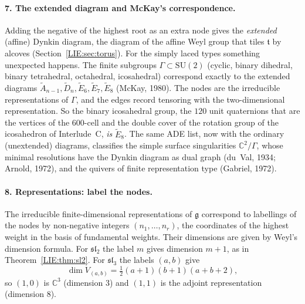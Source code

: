 \documentclass[11pt,openany]{book}
\theoremstyle{plain}
\theoremstyle{definition}
\theoremstyle{remark}
\newcommand{\C}{\mathbb{C}}
\begin{document}
\paragraph{7. The extended diagram and McKay's correspondence.} Adding the negative of the highest
root as an extra node gives the \emph{extended} (affine) Dynkin diagram, the diagram of the affine
Weyl group that tiles $\mathfrak t$ by alcoves (Section~\ref{LIE:sec:torus}). For the simply laced types
something unexpected happens. The finite subgroups $\Gamma\subset\mathrm{SU}(2)$ (cyclic, binary dihedral,
binary tetrahedral, octahedral, icosahedral) correspond exactly to the extended diagrams
$\tilde A_{n-1},\tilde D_n,\tilde E_6,\tilde E_7,\tilde E_8$ (McKay, 1980). The nodes are the
irreducible representations of $\Gamma$, and the edges record tensoring with the two-dimensional
representation. So the binary icosahedral group, the $120$ unit quaternions that are the vertices of
the $600$-cell and the double cover of the rotation group of the icosahedron of Interlude~C, \emph{is}
$\tilde E_8$. The same ADE list, now with the ordinary (unextended) diagrams, classifies the simple
surface singularities $\C^2/\Gamma$, whose minimal resolutions have the Dynkin diagram as dual graph
(du~Val, 1934; Arnold, 1972), and the quivers of finite representation type (Gabriel, 1972).

\paragraph{8. Representations: label the nodes.} The irreducible finite-dimensional representations
of $\mathfrak g$ correspond to labellings of the nodes by non-negative integers $(n_1,\dots,n_r)$, the
coordinates of the highest weight in the basis of fundamental weights. Their dimensions are given by
Weyl's dimension formula. For $\mathfrak{sl}_2$ the label $m$ gives dimension $m+1$, as in
Theorem~\ref{LIE:thm:sl2}. For $\mathfrak{sl}_3$ the labels $(a,b)$ give
\[
  \dim V_{(a,b)}=\tfrac12(a+1)(b+1)(a+b+2),
\]
so $(1,0)$ is $\C^3$ (dimension $3$) and $(1,1)$ is the adjoint representation (dimension $8$).
\end{document}
